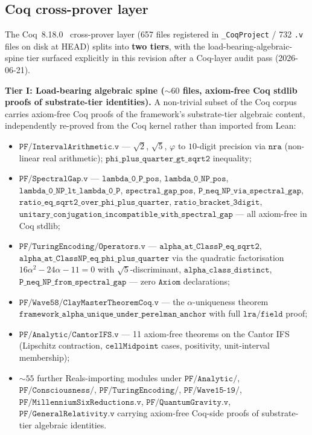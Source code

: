 \documentclass[11pt,a4paper]{amsart}
\theoremstyle{plain}
\theoremstyle{definition}
\begin{document}
\subsection{Coq cross-prover layer}

The Coq~8.18.0~\cite{barras-bertot2009} cross-prover layer (657 files registered in \texttt{\_CoqProject} / 732 \texttt{.v} files on disk at HEAD) splits into \textbf{two tiers}, with the load-bearing-algebraic-spine tier surfaced explicitly in this revision after a Coq-layer audit pass (2026-06-21).

\textbf{Tier I: Load-bearing algebraic spine ($\sim 60$ files, axiom-free Coq stdlib proofs of substrate-tier identities).} A non-trivial subset of the Coq corpus carries axiom-free Coq proofs of the framework's substrate-tier algebraic content, independently re-proved from the Coq kernel rather than imported from Lean:
\begin{itemize}[leftmargin=2em,itemsep=2pt]
\item $\texttt{PF/IntervalArithmetic.v}$ --- $\sqrt{2}$, $\sqrt{5}$, $\varphi$ to $10$-digit precision via $\texttt{nra}$ (non-linear real arithmetic); $\texttt{phi\_plus\_quarter\_gt\_sqrt2}$ inequality;
\item $\texttt{PF/SpectralGap.v}$ --- $\texttt{lambda\_0\_P\_pos}$, $\texttt{lambda\_0\_NP\_pos}$, $\texttt{lambda\_0\_NP\_lt\_lambda\_0\_P}$, $\texttt{spectral\_gap\_pos}$, $\texttt{P\_neq\_NP\_via\_spectral\_gap}$, $\texttt{ratio\_eq\_sqrt2\_over\_phi\_plus\_quarter}$, $\texttt{ratio\_bracket\_3digit}$, $\texttt{unitary\_conjugation\_incompatible\_with\_spectral\_gap}$ --- all axiom-free in Coq stdlib;
\item $\texttt{PF/TuringEncoding/Operators.v}$ --- $\texttt{alpha\_at\_ClassP\_eq\_sqrt2}$, $\texttt{alpha\_at\_ClassNP\_eq\_phi\_plus\_quarter}$ via the quadratic factorisation $16\alpha^2 - 24\alpha - 11 = 0$ with $\sqrt{5}$-discriminant, $\texttt{alpha\_class\_distinct}$, $\texttt{P\_neq\_NP\_from\_spectral\_gap}$ --- zero $\texttt{Axiom}$ declarations;
\item $\texttt{PF/Wave58/ClayMasterTheoremCoq.v}$ --- the $\alpha$-uniqueness theorem $\texttt{framework\_alpha\_unique\_under\_perelman\_anchor}$ with full $\texttt{lra}/\texttt{field}$ proof;
\item $\texttt{PF/Analytic/CantorIFS.v}$ --- 11 axiom-free theorems on the Cantor IFS (Lipschitz contraction, $\texttt{cellMidpoint}$ cases, positivity, unit-interval membership);
\item $\sim 55$ further Reals-importing modules under $\texttt{PF/Analytic/}$, $\texttt{PF/Consciousness/}$, $\texttt{PF/TuringEncoding/}$, $\texttt{PF/Wave15-19/}$, $\texttt{PF/MillenniumSixReductions.v}$, $\texttt{PF/QuantumGravity.v}$, $\texttt{PF/GeneralRelativity.v}$ carrying axiom-free Coq-side proofs of substrate-tier algebraic identities.
\end{itemize}
\end{document}
